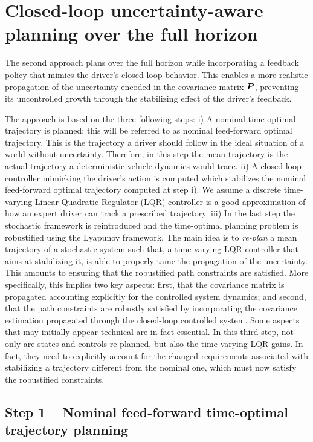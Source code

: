 \section{Closed-loop uncertainty-aware planning over the full horizon}
\label{sec:closed_loop_planning}

The second approach plans over the full horizon while incorporating a feedback policy that mimics the driver's closed-loop behavior. This enables a more realistic propagation of the uncertainty encoded in the covariance matrix $\boldsymbol{P}$, preventing its uncontrolled growth through the stabilizing effect of the driver's feedback.

The approach is based on the three following steps: i) A nominal time-optimal trajectory is planned: this will be referred to as nominal feed-forward optimal trajectory. This is the trajectory a driver should follow in the ideal situation of a world without uncertainty. Therefore, in this step the mean trajectory is the actual trajectory a deterministic vehicle dynamics would trace. ii) A closed-loop controller mimicking the driver's action is computed which stabilizes the nominal feed-forward optimal trajectory computed at step i). We assume a discrete time-varying Linear Quadratic Regulator (LQR) controller is a good approximation of how an expert driver can track a prescribed trajectory. iii) In the last step the stochastic framework is reintroduced and the time-optimal planning problem is robustified using the Lyapunov framework. The main idea is to \emph{re-plan} a mean trajectory of a stochastic system such that, a time-varying LQR controller that aims at stabilizing it, is able to properly tame the propagation of the uncertainty. This amounts to ensuring that the robustified path constraints are satisfied. More specifically, this implies two key aspects: first, that the covariance matrix is propagated accounting explicitly for the controlled system dynamics; and second, that the path constraints are robustly satisfied by incorporating the covariance estimation propagated through the closed-loop controlled system. Some aspects that may initially appear technical are in fact essential. In this third step, not only are states and controls re-planned, but also the time-varying LQR gains. In fact, they need to explicitly account for the changed requirements associated with stabilizing a trajectory different from the nominal one, which must now satisfy the robustified constraints.
\subsection{Step 1 -- Nominal feed-forward time-optimal trajectory planning}
\label{sec:nominalFF}

